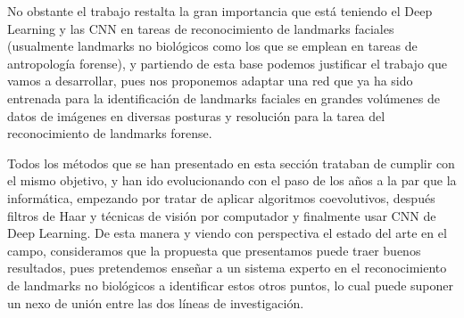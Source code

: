                 \medskip

                \noindent No obstante el trabajo restalta la gran importancia que está teniendo el Deep Learning y las CNN en tareas de reconocimiento de landmarks faciales (usualmente landmarks no biológicos como los que se emplean en tareas de antropología forense), y partiendo de esta base podemos justificar el trabajo que vamos a desarrollar, pues nos proponemos adaptar una red que ya ha sido entrenada para la identificación de landmarks faciales en grandes volúmenes de datos de imágenes en diversas posturas y resolución para la tarea del reconocimiento de landmarks forense.

                \medskip

                \noindent Todos los métodos que se han presentado en esta sección trataban de cumplir con el mismo objetivo, y han ido evolucionando con el paso de los años a la par que la informática, empezando por tratar de aplicar algoritmos coevolutivos, después filtros de Haar y técnicas de visión por computador y finalmente usar CNN de Deep Learning. De esta manera y viendo con perspectiva el estado del arte en el campo, consideramos que la propuesta que presentamos puede traer buenos resultados, pues pretendemos enseñar a un sistema experto en el reconocimiento de landmarks no biológicos a identificar estos otros puntos, lo cual puede suponer un nexo de unión entre las dos líneas de investigación.
   
\endinput

